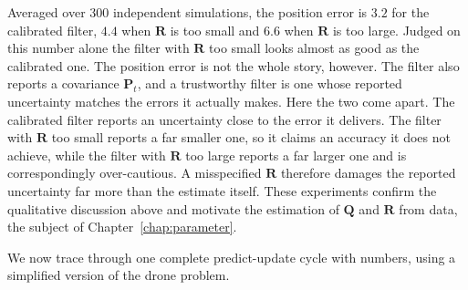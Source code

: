 \begin{example}
Averaged over $300$ independent simulations, the position error is $3.2$ for the calibrated filter, $4.4$ when $\mathbf{R}$ is too small and $6.6$ when $\mathbf{R}$ is too large. Judged on this number alone the filter with $\mathbf{R}$ too small looks almost as good as the calibrated one. The position error is not the whole story, however. The filter also reports a covariance $\mathbf{P}_t$, and a trustworthy filter is one whose reported uncertainty matches the errors it actually makes. Here the two come apart. The calibrated filter reports an uncertainty close to the error it delivers. The filter with $\mathbf{R}$ too small reports a far smaller one, so it claims an accuracy it does not achieve, while the filter with $\mathbf{R}$ too large reports a far larger one and is correspondingly over-cautious. A misspecified $\mathbf{R}$ therefore damages the reported uncertainty far more than the estimate itself.
These experiments confirm the qualitative discussion above and motivate the estimation of $\mathbf{Q}$ and $\mathbf{R}$ from data, the subject of Chapter~\ref{chap:parameter}.
\end{example}
We now trace through one complete predict-update cycle with numbers, using a simplified version of the drone problem.
